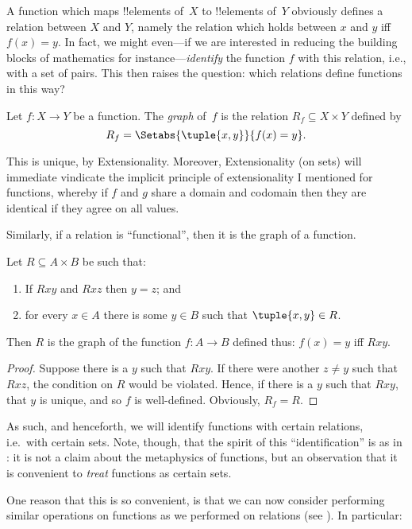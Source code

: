 \documentclass[../../../include/open-logic-section]{subfiles}
\begin{document}


\begin{explain}
A function which maps !!{element}s of~$X$ to !!{element}s of~$Y$
obviously defines a relation between $X$ and $Y$, namely the relation
which holds between $x$ and $y$ iff $f(x) = y$.  In fact, we might
even---if we are interested in reducing the building blocks of
mathematics for instance---\emph{identify} the function $f$ with this
relation, i.e., with a set of pairs.  This then raises the question:
which relations define functions in this way?
\end{explain}

\begin{defn}
Let $f\colon X \to Y$ be a function. The \emph{graph} of~$f$
is the relation $R_f \subseteq X \times Y$ defined by
\[
R_f = \Setabs{\tuple{x,y}}{f(x) = y}.
\]
\end{defn}
\begin{explain}
	This is unique, by Extensionality. Moreover, Extensionality (on sets) will immediate vindicate the implicit principle of extensionality I mentioned for functions, whereby if $f$ and $g$ share a domain and codomain then they are identical if they agree on all values. 
	
	Similarly, if a relation is ``functional'', then it is the graph of a function. 
\end{explain}
\begin{prop}
Let $R \subseteq A \times B$ be such that:
\begin{enumerate}
	\item If $Rxy$
and $Rxz$ then $y = z$; and 
	\item for every $x \in A$ there is some $y \in B$ such that $\tuple{x, y} \in R$.  
	\end{enumerate}
Then $R$ is the graph of the
function $f\colon A \to B$ defined thus: $f(x) = y$ iff $Rxy$. 
\end{prop}
\begin{proof}
Suppose there is a $y$ such that $Rxy$.  If there were another $z
\neq y$ such that $Rxz$, the condition on $R$ would be
violated. Hence, if there is a $y$ such that $Rxy$, that $y$ is
unique, and so $f$ is well-defined.  Obviously, $R_f = R$. 
\end{proof}
\begin{explain}
	As such, and henceforth, we will identify functions with certain relations, i.e.\ with certain sets. Note, though, that the spirit of this ``identification'' is as in : it is not a claim about the metaphysics of functions, but an observation that it is convenient to \emph{treat} functions as certain sets. 
	
	One reason that this is so convenient, is that we can now consider performing similar operations on functions as we performed on relations (see ). In particular:
	\end{explain}
\end{document}
